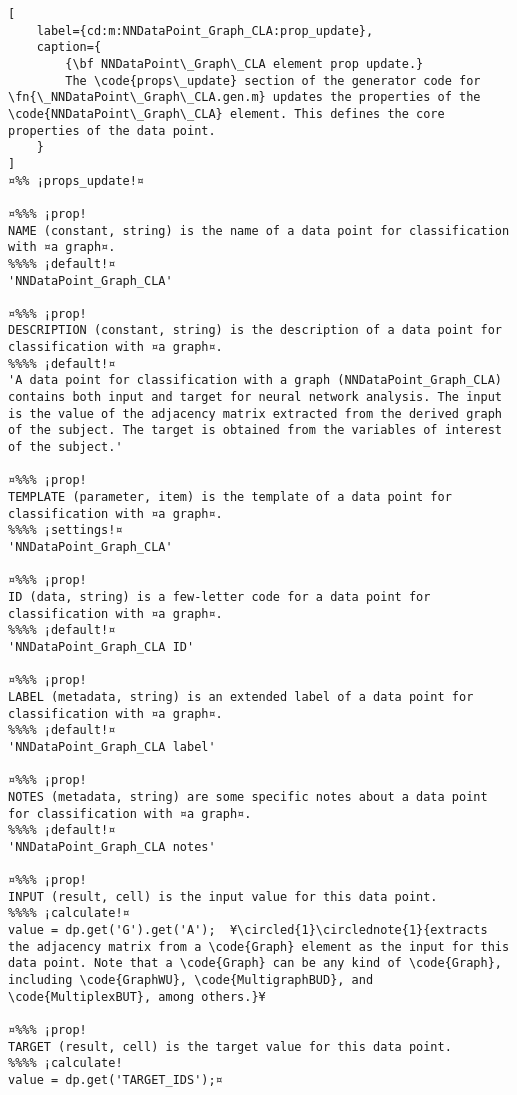 \documentclass{tufte-handout}
\begin{document}
\begin{lstlisting}[
	label={cd:m:NNDataPoint_Graph_CLA:prop_update},
	caption={
		{\bf NNDataPoint\_Graph\_CLA element prop update.}
		The \code{props\_update} section of the generator code for \fn{\_NNDataPoint\_Graph\_CLA.gen.m} updates the properties of the \code{NNDataPoint\_Graph\_CLA} element. This defines the core properties of the data point.
	}
]
¤%% ¡props_update!¤

¤%%% ¡prop!
NAME (constant, string) is the name of a data point for classification with ¤a graph¤.
%%%% ¡default!¤
'NNDataPoint_Graph_CLA'

¤%%% ¡prop!
DESCRIPTION (constant, string) is the description of a data point for classification with ¤a graph¤.
%%%% ¡default!¤
'A data point for classification with a graph (NNDataPoint_Graph_CLA) contains both input and target for neural network analysis. The input is the value of the adjacency matrix extracted from the derived graph of the subject. The target is obtained from the variables of interest of the subject.'

¤%%% ¡prop!
TEMPLATE (parameter, item) is the template of a data point for classification with ¤a graph¤.
%%%% ¡settings!¤
'NNDataPoint_Graph_CLA'

¤%%% ¡prop!
ID (data, string) is a few-letter code for a data point for classification with ¤a graph¤.
%%%% ¡default!¤
'NNDataPoint_Graph_CLA ID'

¤%%% ¡prop!
LABEL (metadata, string) is an extended label of a data point for classification with ¤a graph¤.
%%%% ¡default!¤
'NNDataPoint_Graph_CLA label'

¤%%% ¡prop!
NOTES (metadata, string) are some specific notes about a data point for classification with ¤a graph¤.
%%%% ¡default!¤
'NNDataPoint_Graph_CLA notes'

¤%%% ¡prop!
INPUT (result, cell) is the input value for this data point.
%%%% ¡calculate!¤
value = dp.get('G').get('A');  ¥\circled{1}\circlednote{1}{extracts the adjacency matrix from a \code{Graph} element as the input for this data point. Note that a \code{Graph} can be any kind of \code{Graph}, including \code{GraphWU}, \code{MultigraphBUD}, and \code{MultiplexBUT}, among others.}¥
    
¤%%% ¡prop!
TARGET (result, cell) is the target value for this data point.
%%%% ¡calculate!
value = dp.get('TARGET_IDS');¤

\end{lstlisting}
\end{document}

